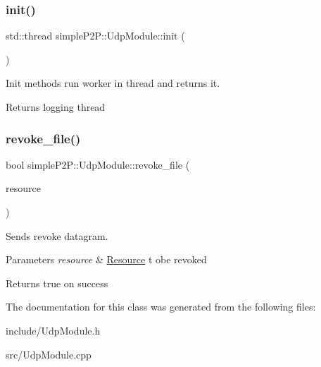 \subsubsection{\texorpdfstring{init()}{init()}}
{\footnotesize\ttfamily std\+::thread simple\+P2\+P\+::\+Udp\+Module\+::init (\begin{DoxyParamCaption}{ }\end{DoxyParamCaption})}



Init methods run worker in thread and returns it. 

\begin{DoxyReturn}{Returns}
logging thread 
\end{DoxyReturn}
\mbox{\label{classsimpleP2P_1_1UdpModule_a087b1b9aa9c20724df4856d43a90e031}} 
\subsubsection{\texorpdfstring{revoke\+\_\+file()}{revoke\_file()}}
{\footnotesize\ttfamily bool simple\+P2\+P\+::\+Udp\+Module\+::revoke\+\_\+file (\begin{DoxyParamCaption}\item[{const \hyperlink{classsimpleP2P_1_1Resource}{Resource} \&}]{resource }\end{DoxyParamCaption})}



Sends revoke datagram. 


\begin{DoxyParams}{Parameters}
{\em resource} & \hyperlink{classsimpleP2P_1_1Resource}{Resource} t obe revoked \\
\hline
\end{DoxyParams}
\begin{DoxyReturn}{Returns}
true on success 
\end{DoxyReturn}


The documentation for this class was generated from the following files\+:\begin{DoxyCompactItemize}
\item 
include/Udp\+Module.\+h\item 
src/Udp\+Module.\+cpp\end{DoxyCompactItemize}
